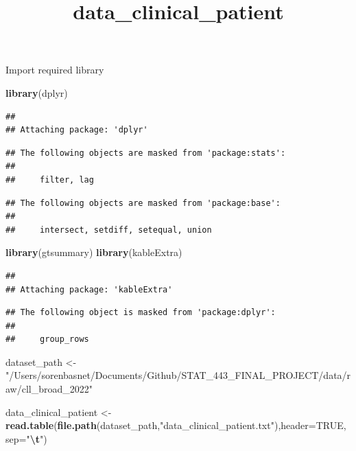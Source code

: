 \documentclass[
]{article}
\title{data\_clinical\_patient}
\author{}
\date{\vspace{-2.5em}}
\newenvironment{Shaded}{\begin{snugshade}}{\end{snugshade}}
\newcommand{\AttributeTok}[1]{\textcolor[rgb]{0.13,0.29,0.53}{#1}}
\newcommand{\ConstantTok}[1]{\textcolor[rgb]{0.56,0.35,0.01}{#1}}
\newcommand{\FunctionTok}[1]{\textcolor[rgb]{0.13,0.29,0.53}{\textbf{#1}}}
\newcommand{\NormalTok}[1]{#1}
\newcommand{\OtherTok}[1]{\textcolor[rgb]{0.56,0.35,0.01}{#1}}
\newcommand{\SpecialCharTok}[1]{\textcolor[rgb]{0.81,0.36,0.00}{\textbf{#1}}}
\newcommand{\StringTok}[1]{\textcolor[rgb]{0.31,0.60,0.02}{#1}}
\begin{document}
\maketitle

Import required library

\begin{Shaded}
\begin{Highlighting}[]
\FunctionTok{library}\NormalTok{(dplyr)}
\end{Highlighting}
\end{Shaded}

\begin{verbatim}
## 
## Attaching package: 'dplyr'
\end{verbatim}

\begin{verbatim}
## The following objects are masked from 'package:stats':
## 
##     filter, lag
\end{verbatim}

\begin{verbatim}
## The following objects are masked from 'package:base':
## 
##     intersect, setdiff, setequal, union
\end{verbatim}

\begin{Shaded}
\begin{Highlighting}[]
\FunctionTok{library}\NormalTok{(gtsummary)}
\FunctionTok{library}\NormalTok{(kableExtra)}
\end{Highlighting}
\end{Shaded}

\begin{verbatim}
## 
## Attaching package: 'kableExtra'
\end{verbatim}

\begin{verbatim}
## The following object is masked from 'package:dplyr':
## 
##     group_rows
\end{verbatim}

\begin{Shaded}
\begin{Highlighting}[]
\NormalTok{dataset\_path }\OtherTok{\textless{}{-}} \StringTok{"/Users/sorenbasnet/Documents/Github/STAT\_443\_FINAL\_PROJECT/data/raw/cll\_broad\_2022"}
\end{Highlighting}
\end{Shaded}

\begin{Shaded}
\begin{Highlighting}[]
\NormalTok{data\_clinical\_patient }\OtherTok{\textless{}{-}} \FunctionTok{read.table}\NormalTok{(}\FunctionTok{file.path}\NormalTok{(dataset\_path,}\StringTok{"data\_clinical\_patient.txt"}\NormalTok{),}\AttributeTok{header=}\ConstantTok{TRUE}\NormalTok{, }\AttributeTok{sep=}\StringTok{"}\SpecialCharTok{\textbackslash{}t}\StringTok{"}\NormalTok{)}
\end{Highlighting}
\end{Shaded}
\end{document}
